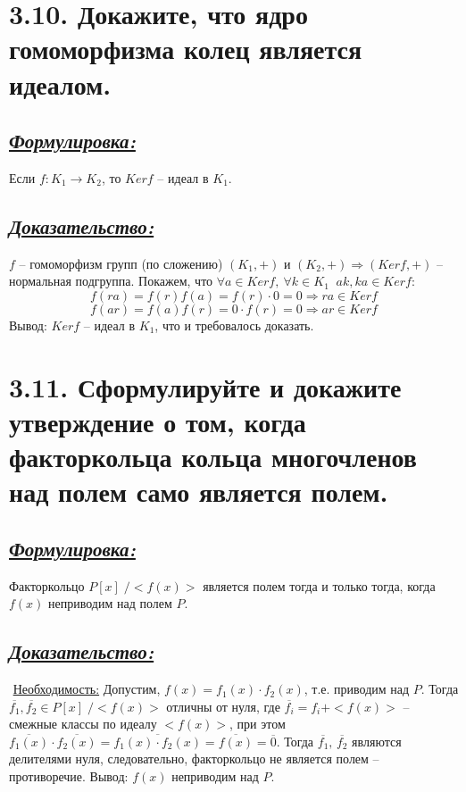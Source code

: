 \documentclass{article}
\begin{document}
\section*{\LARGE 3.10. Докажите, что ядро гомоморфизма колец является идеалом. }
\subsection*{\Large \underline{\textit{Формулировка: }}}
Если $f : K_1 \rightarrow K_2$, то $Kerf$ -- идеал в $K_1$. 

\subsection*{\Large \underline{\textit{Доказательство: }}}
$f$ -- гомоморфизм групп (по сложению) $(K_1, +)$ и $(K_2, +) \Rightarrow (Kerf, +)$ -- нормальная подгруппа. Покажем, что $\forall a \in Kerf,\: \forall k \in K_1 \;\; ak, ka \in Kerf$:
$$f(ra) = f(r)f(a) = f(r)\cdot 0 = 0 \Rightarrow ra \in Kerf$$
$$f(ar) = f(a)f(r) = 0\cdot f(r) = 0 \Rightarrow ar \in Kerf$$
Вывод: $Kerf$ -- идеал в $K_1$, что и требовалось доказать.

\section*{\LARGE 3.11. Сформулируйте и докажите утверждение о том, когда факторкольца кольца многочленов над полем само является полем. }
\subsection*{\Large \underline{\textit{Формулировка: }}}
Факторкольцо $P[x] \;/ <f(x)>$ является полем тогда и только тогда, когда $f(x)$ неприводим над полем $P$.

\subsection*{\Large \underline{\textit{Доказательство: }}}
$ $ \indent \underline{Необходимость:}
\newline Допустим, $f(x) = f_1(x) \cdot f_2(x)$, т.е. приводим над $P$. Тогда 
\newline $\overline{f_1}, \overline{f_2} \in P[x] \;/ <f(x)>$ отличны от нуля, где $\overline{f_i} = f_i + <f(x)>$ -- смежные классы по идеалу $<f(x)>$, при этом $\overline{f_1(x)}\cdot \overline{f_2(x)} = \overline{f_1(x) \cdot f_2(x)} = \overline{f(x)} = \overline{0}$. Тогда $\overline{f_1},\, \overline{f_2}$ являются делителями нуля, следовательно, факторкольцо не является полем -- противоречие. Вывод: $f(x)$ неприводим над $P$.
\end{document}

